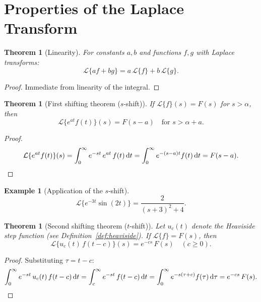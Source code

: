 \documentclass[12pt,a4paper,openany]{book}
\theoremstyle{definition}
\newtheorem{example}[definition]{Example}
\theoremstyle{plain}
\newtheorem{theorem}[definition]{Theorem}
\theoremstyle{remark}
\newcommand{\dd}{\mathrm{d}}
\begin{document}
\section{Properties of the Laplace Transform}
\label{sec:laplace-properties}

\begin{theorem}[Linearity]
\label{thm:laplace-linear}
For constants \(a,b\) and functions \(f,g\) with Laplace transforms:
\[
  \mathcal{L}\{af+bg\} = a\,\mathcal{L}\{f\} + b\,\mathcal{L}\{g\}.
\]
\end{theorem}

\begin{proof}
Immediate from linearity of the integral.
\end{proof}

\begin{theorem}[First shifting theorem (\(s\)-shift)]
\label{thm:s-shift}
If \(\mathcal{L}\{f\}(s)=F(s)\) for \(s>\alpha\), then
\begin{equation}\label{eq:s-shift}
  \mathcal{L}\{e^{at}f(t)\}(s) = F(s-a) \quad \text{for } s>\alpha+a.
\end{equation}
\end{theorem}

\begin{proof}
\[
  \mathcal{L}\{e^{at}f(t)\}(s)
  = \int_0^\infty e^{-st}\,e^{at}\,f(t)\,\dd t
  = \int_0^\infty e^{-(s-a)t}f(t)\,\dd t
  = F(s-a). \qedhere
\]
\end{proof}

\begin{example}[Application of the \(s\)-shift]
\label{ex:s-shift-app}
\[
  \mathcal{L}\{e^{-3t}\sin(2t)\}
  = \frac{2}{(s+3)^2+4}.
\]
\end{example}

\begin{theorem}[Second shifting theorem (\(t\)-shift)]
\label{thm:t-shift}
Let \(u_c(t)\) denote the Heaviside step function
(see Definition~\ref{def:heaviside}). If \(\mathcal{L}\{f\}=F(s)\), then
\begin{equation}\label{eq:t-shift}
  \mathcal{L}\{u_c(t)\,f(t-c)\}(s) = e^{-cs}\,F(s) \quad (c\ge 0).
\end{equation}
\end{theorem}

\begin{proof}
Substituting \(\tau=t-c\):
\[
  \int_0^\infty e^{-st}\,u_c(t)\,f(t-c)\,\dd t
  = \int_c^\infty e^{-st}\,f(t-c)\,\dd t
  = \int_0^\infty e^{-s(\tau+c)}f(\tau)\,\dd\tau
  = e^{-cs}\,F(s). \qedhere
\]
\end{proof}
\end{document}

